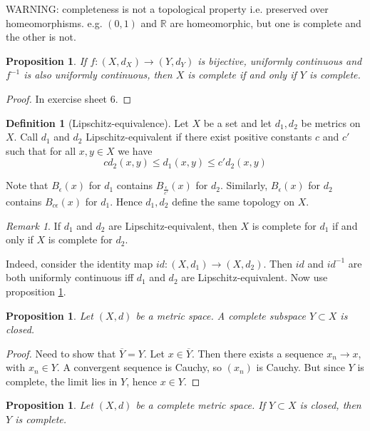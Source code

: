 \documentclass{article}
\theoremstyle{definition}
\newtheorem{defn}{Definition}[section]
\theoremstyle{plain}%
\newtheorem{prop}[thm]{Proposition}
\theoremstyle{remark}
\newtheorem*{rem}{Remark}
\newcommand{\R}{\mathbb{R}}
\begin{document}
WARNING: completeness is not a topological property i.e. preserved over homeomorphisms. e.g. $(0,1)$ and $\R$ are homeomorphic, but one is complete and the other is not.

\begin{prop}\label{Completeness preserved map}
    If $f : (X, d_X) \to (Y, d_Y)$ is bijective, uniformly continuous and $f^{-1}$ is also uniformly continuous, then $X$ is complete if and only if $Y$ is complete.
\end{prop}

\begin{proof}
     In exercise sheet 6.
\end{proof}

\begin{defn}[Lipschitz-equivalence]
    Let $X$ be a set and let $d_1, d_2$ be metrics on $X$. Call $d_1$ and $d_2$ Lipschitz-equivalent if there exist positive constants $c$ and $c'$ such that for all $x, y \in X$ we have
    \[c d_2(x,y) \le d_1(x,y) \le c'd_2(x,y)\]
\end{defn}

 Note that $B_{\epsilon}(x)$ for $d_1$ contains $B_{\frac{\epsilon}{c'}}(x)$ for $d_2$. Similarly, $B_\epsilon(x)$ for $d_2$ contains $B_{c \epsilon}(x)$ for $d_1$. Hence $d_1, d_2$ define the same topology on $X$.

\begin{rem}
   If $d_1$ and $d_2$ are Lipschitz-equivalent, then $X$ is complete for $d_1$ if and only if $X$ is complete for $d_2$.
\end{rem}

Indeed, consider the identity map  $id: (X, d_1) \to (X, d_2)$. Then $id$ and $id^{-1}$ are both uniformly continuous iff $d_1$ and $d_2$ are Lipschitz-equivalent. Now use proposition \ref{Completeness preserved map}.

\begin{prop}
    Let $(X,d)$ be a metric space. A complete subspace $Y \subset X$ is closed.
\end{prop}

\begin{proof}
     Need to show that $\overline{Y} = Y$. Let $x \in \overline{Y}$. Then there exists a sequence $x_n \to x$, with $x_n \in Y$. A convergent sequence is Cauchy, so $(x_n)$ is Cauchy. But since $Y$ is complete, the limit lies in $Y$, hence $x \in Y$.  
\end{proof}

\begin{prop}
    Let $(X,d)$ be a complete metric space. If $Y \subset X$ is closed, then $Y$ is complete.
\end{prop}
\end{document}
